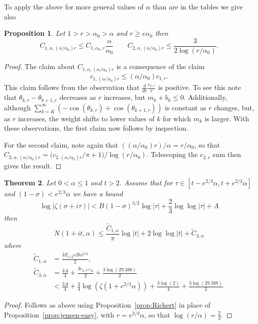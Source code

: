 \documentclass[10pt,english,letter, reqno]{amsart}
\theoremstyle{plain}
\newtheorem{theorem}{Theorem}
\newtheorem{proposition}[theorem]{Proposition}
\theoremstyle{definition}
\begin{document}
To apply the above for more general values of $\alpha$ than are in the tables we give also
\begin{proposition}\label{prop:Cscaling}
Let $1>r>\alpha_0>\alpha$ and $r\geq e\alpha_0$ then
\[  C_{1,\alpha,(\alpha/\alpha_0)r} \leq C_{1,\alpha_0,r}\frac{\alpha}{\alpha_0}\qquad C_{2,\alpha,(\alpha/\alpha_0)r} \leq \frac{3}{2\log(r/\alpha_0)} .\]
\end{proposition}
\begin{proof}
The claim about $C_{1,\alpha,(\alpha/\alpha_0)r}$ is a consequence of the claim
\[  c_{1,(\alpha/\alpha_0)r}  \leq (\alpha/\alpha_0)c_{1,r}. \]
This claim follows from the observation that $\frac{d}{dr} \frac{c_{1,r}}{r}$ is positive.
To see this note that $\theta_{k,r} - \theta_{k+1,r}$ decreases as $r$ increases, but $m_k+b_k\leq 0$.
Additionally, although $\sum_{k=K}^{\infty} (-\cos(\theta_{k,r}) + \cos(\theta_{k+1,r}))$ is constant as $r$ changes, but, as $r$ increases, the weight shifts to lower values of $k$ for which $m_k$ is larger.
With these observations, the first claim now follows by inspection.

For the second claim, note again that $((\alpha/\alpha_0)r)/\alpha=r/\alpha_0$, so that
$C_{2,\alpha,(\alpha/\alpha_0)r}=\bigl(c_{2,(\alpha/\alpha_0)r}/\pi+1\bigr)/\log(r/\alpha_0)$. Telescoping the $c_{2,r}$ sum then gives the result.
\end{proof}

\begin{theorem}\label{thm:circularregions2}
Let $0<\alpha\leq 1$ and $t>2$. Assume that for $\tau\in [t-e^{2/3}\alpha,t+e^{2/3}\alpha]$ and
$(1-\sigma)< e^{2/3}\alpha$ we have a bound
\[ \log|\zeta(\sigma+i\tau) | < B(1-\sigma)^{3/2}\log|\tau| + \frac{2}{3} \log\log|\tau| + A \]
then
\[ N(1+it,\alpha) \leq
\frac{\tilde{C}_{1,\alpha}}{\pi} \log|t| +
2 \log\log|t| +
\tilde{C}_{3,\alpha}
\]
where
\begin{align*}
 \tilde{C}_{1,\alpha} & = \frac{3E_{1/2}e B\alpha^{3/2}}{2},  \\ 
 \tilde{C}_{3,\alpha} & = \frac{3A}{4} + \frac{3c_{4,e^{2/3}\alpha}}{2} + \frac{3\log(29.388)}{2}\\
 & <  \frac{3A}{4}  + \frac{3}{4}\log(\zeta(1+e^{2/3}\alpha)) + \frac{3\log(2)}{4}+ \frac{3\log(29.388)}{2}.
\end{align*}
\end{theorem}
\begin{proof}
Follows as above using Proposition~\ref{prop:Richert} in place of Proposition~\ref{prop:jensen-easy},
with $r=e^{2/3}\alpha$, so that $\log(r/\alpha)=\frac{2}{3}$.
\end{proof}
\end{document}
